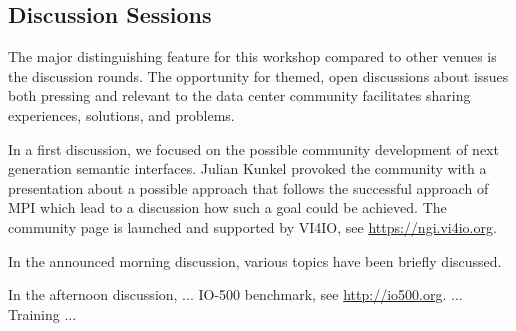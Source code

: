 \documentclass{llncs}
\begin{document}
\subsection{Discussion Sessions}

The major distinguishing feature for this workshop compared to other venues is the discussion rounds.
The opportunity for themed, open discussions about issues both pressing and relevant to the data center
community facilitates sharing experiences, solutions, and problems.

In a first discussion, we focused on the possible community development of next generation semantic interfaces. Julian Kunkel provoked the community with a presentation about a possible approach that follows the successful approach of MPI which lead to a discussion how such a goal could be achieved.
The community page is launched and supported by VI4IO, see \url{https://ngi.vi4io.org}.


In the announced morning discussion, various topics have been briefly discussed.


In the afternoon discussion, ...
IO-500 benchmark, see \url{http://io500.org}.
... Training ...





{}
\end{document}
